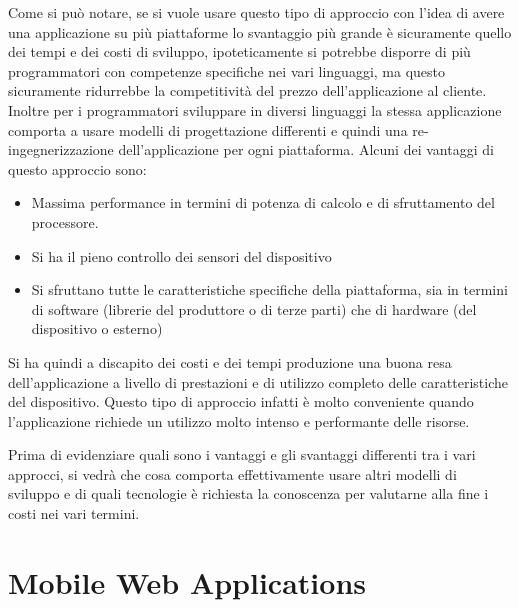 Come si può notare, se si  vuole usare questo tipo di approccio con l'idea di avere una applicazione su più piattaforme lo svantaggio più grande è sicuramente quello dei tempi e dei costi di sviluppo, ipoteticamente si potrebbe disporre di più programmatori con competenze specifiche nei vari linguaggi, ma questo sicuramente ridurrebbe la competitività del prezzo dell'applicazione al cliente. Inoltre per i programmatori sviluppare in diversi linguaggi la stessa applicazione comporta a usare modelli di progettazione differenti e quindi una re-ingegnerizzazione dell'applicazione per ogni piattaforma.
Alcuni dei vantaggi di questo approccio sono:

\begin{itemize}
\item Massima performance in termini di potenza di calcolo e di sfruttamento del processore.
\item Si ha il pieno controllo dei sensori del dispositivo
\item Si sfruttano tutte le caratteristiche specifiche della piattaforma, sia in termini di software (librerie del produttore o di terze parti) che di hardware (del dispositivo o esterno)
\end{itemize}

Si ha quindi a discapito dei costi e dei tempi produzione una buona resa dell'applicazione a livello di prestazioni e di utilizzo completo delle caratteristiche del dispositivo. Questo tipo di approccio infatti è molto conveniente quando l'applicazione richiede un utilizzo molto intenso e performante delle risorse.

Prima di evidenziare quali sono i vantaggi e gli svantaggi differenti tra i vari approcci, si vedrà che cosa comporta effettivamente usare altri modelli di sviluppo e di quali tecnologie è richiesta la conoscenza per valutarne alla fine i costi nei vari termini.  

\section{Mobile Web Applications}

